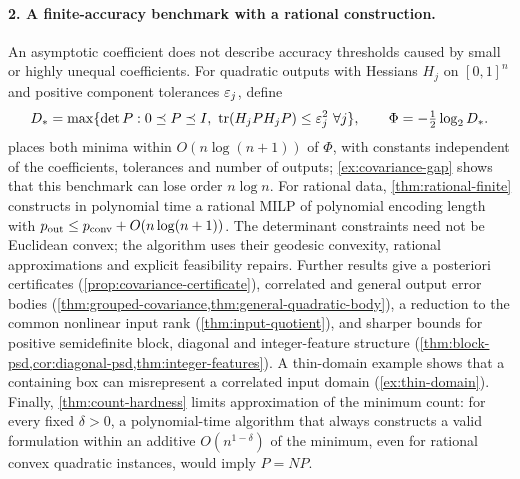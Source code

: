 \paragraph{2. A finite-accuracy benchmark with a rational construction.}
An asymptotic coefficient does not describe accuracy thresholds caused
by small or highly unequal coefficients. For quadratic outputs with
Hessians $H_j$ on $[0,1]^n$ and positive component tolerances $\varepsilon_j$,
define
\[
 D_* = \max\{\det P:0\preceq P\preceq I,
       \ \operatorname{tr}(H_jPH_jP)\le\varepsilon_j^2\ \forall j\},
 \qquad \Phi=-\tfrac12\log_2 D_*.
\]
 places both minima within
$O(n\log(n+1))$ of $\Phi$, with constants independent of the
coefficients, tolerances and number of outputs; \cref{ex:covariance-gap}
shows that this benchmark can lose order $n\log n$. For rational data,
\cref{thm:rational-finite} constructs in polynomial time a rational MILP
of polynomial encoding length with $p_{\mathrm{out}}\le p_{\mathrm{conv}}+O(n\log(n+1))$. The
determinant constraints need not be Euclidean convex; the algorithm uses
their geodesic convexity, rational approximations and explicit
feasibility repairs. Further results give a posteriori certificates
(\cref{prop:covariance-certificate}), correlated and general output
error bodies (\cref{thm:grouped-covariance,thm:general-quadratic-body}),
a reduction to the common nonlinear input rank
(\cref{thm:input-quotient}), and sharper bounds for positive
semidefinite block, diagonal and integer-feature structure
(\cref{thm:block-psd,cor:diagonal-psd,thm:integer-features}). A
thin-domain example shows that a containing box can misrepresent a
correlated input domain (\cref{ex:thin-domain}). Finally,
\cref{thm:count-hardness} limits approximation of the minimum count:
for every fixed $\delta>0$, a polynomial-time algorithm that always
constructs a valid formulation within an additive $O(n^{1-\delta})$ of
the minimum, even for rational convex quadratic instances, would imply
$P=NP$.

